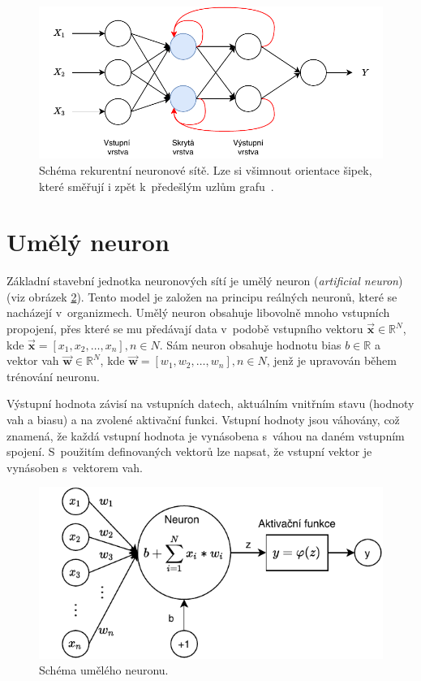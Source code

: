 \begin{figure}[H]
    \centering
    \includegraphics[scale=1.0]{obrazky-figures/feedforward_vs_recurrent.pdf}
    \caption{\label{fig:recurrentnn}Schéma rekurentní neuronové sítě. Lze si všimnout orientace šipek, které směřují i zpět k~předešlým uzlům grafu~\cite{FFandRecNN}.}
\end{figure}


\section{Umělý neuron}
Základní stavební jednotka neuronových sítí je umělý neuron (\textit{artificial neuron}) (viz obrázek \ref{fig:neuron}). Tento model je založen na principu reálných neuronů, které se nacházejí v~organizmech. Umělý neuron obsahuje libovolně mnoho vstupních propojení, přes které se mu předávají data v~podobě vstupního vektoru $\boldsymbol{\overrightarrow{x}} \in \mathbb{R}^N$, kde $\boldsymbol{\overrightarrow{x}} = [x_1, x_2, \dots, x_n], n \in N$. Sám neuron obsahuje hodnotu bias $b \in \mathbb{R}$ a vektor vah $\boldsymbol{\overrightarrow{w}} \in \mathbb{R}^N$, kde $\boldsymbol{\overrightarrow{w}} = [w_1, w_2, \dots, w_n], n \in N$, jenž je upravován během trénování neuronu.

Výstupní hodnota závisí na vstupních datech, aktuálním vnitřním stavu (hodnoty vah a biasu) a na zvolené aktivační funkci. Vstupní hodnoty jsou váhovány, což znamená, že každá vstupní hodnota je vynásobena s~váhou na daném vstupním spojení. S~použitím definovaných vektorů lze napsat, že vstupní vektor je vynásoben s~vektorem vah.

\begin{figure}[H]
    \centering
    \includegraphics[scale=1.1]{obrazky-figures/perceptron.pdf}
    \caption{\label{fig:neuron}Schéma umělého neuronu.}
\end{figure}

